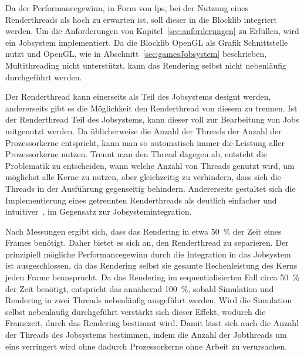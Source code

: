 Da der Performancegewinn, in Form von \ac{fps}, bei der Nutzung eines Renderthreads als hoch zu erwarten ist, soll dieser in die Blocklib integriert werden. Um die Anforderungen von Kapitel~\ref{sec:anforderungen} zu Erfüllen, wird ein Jobsystem implementiert. Da die Blocklib OpenGL als Grafik Schnittstelle nutzt und OpenGL, wie in Abschnitt~\ref{sec:gamesJobsystem} beschrieben, Multithreading nicht unterstützt, kann das Rendering selbst nicht nebenläufig durchgeführt werden.

Der Renderthread kann einerseits als Teil des Jobsystems designt werden, andererseits gibt es die Möglichkeit den Renderthread von diesem zu trennen. Ist der Renderthread Teil des Jobsystems, kann dieser voll zur Bearbeitung von Jobs mitgenutzt werden. Da üblicherweise die Anzahl der Threads der Anzahl der Prozessorkerne entspricht, kann man so automatisch immer die Leistung aller Prozessorkerne nutzen. Trennt man den Thread dagegen ab, entsteht die Problematik zu entscheiden, wann welche Anzahl von Threads genutzt wird, um möglichst alle Kerne zu nutzen, aber gleichzeitig zu verhindern, dass sich die Threads in der Ausführung gegenseitig behindern. Andererseits gestaltet sich die Implementierung eines getrennten Renderthreads als deutlich einfacher und intuitiver~\cite{Tatarchuk2014}, im Gegensatz zur Jobsystemintegration.

Nach Messungen ergibt sich, dass das Rendering in etwa \SI{50}{\percent} der Zeit eines Frames benötigt. Daher bietet es sich an, den Renderthread zu separieren. Der prinzipiell mögliche Performancegewinn durch die Integration in das Jobsystem ist ausgeschlossen, da das Rendering selbst sie gesamte Rechenleistung des Kerns jeden Frame beansprucht. Da das Rendering im sequentialisierten Fall circa \SI{50}{\percent} der Zeit benötigt, entspricht das annähernd \SI{100}{\percent}, sobald Simulation und Rendering in zwei Threads nebenläufig ausgeführt werden. Wird die Simulation selbst nebenläufig durchgeführt verstärkt sich dieser Effekt, wodurch die Framezeit, durch das Rendering bestimmt wird. Damit lässt sich auch die Anzahl der Threads des Jobsystems bestimmen, indem die Anzahl der Jobthreads um eins verringert wird ohne dadurch Prozessorkerne ohne Arbeit zu verursachen.

